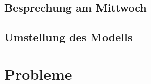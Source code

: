 \documentclass[a4paper,12pt,fleqn]{article}
\begin{document}
\subsection{Besprechung am Mittwoch}
%
\subsection{Umstellung des Modells}
%
%
\section{Probleme}
\label{Problems}
%


\newpage


\end{document}
